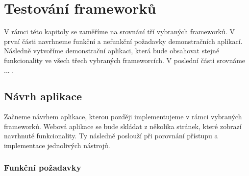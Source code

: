 \section{Testování frameworků}

V rámci této kapitoly se zaměříme na srovnání tří vybraných frameworků. V první části navrhneme funkční a nefunkční požadavky demonstračních aplikací. 
Následně vytvoříme demonstrační aplikaci, která bude obsahovat stejné funkcionality ve všech třech vybraných frameworcích. 
V poslední části srovnáme ... .

\subsection{Návrh aplikace}

Začneme návrhem aplikace, kterou později implementujeme v rámci vybraných frameworků. 
Webová aplikace se bude skládat z několika stránek, které zobrazí navrhnuté funkcionality. 
Ty následně poslouží při porovnání přístupu a implementace jednolivých nástrojů.

\subsubsection{Funkční požadavky}

